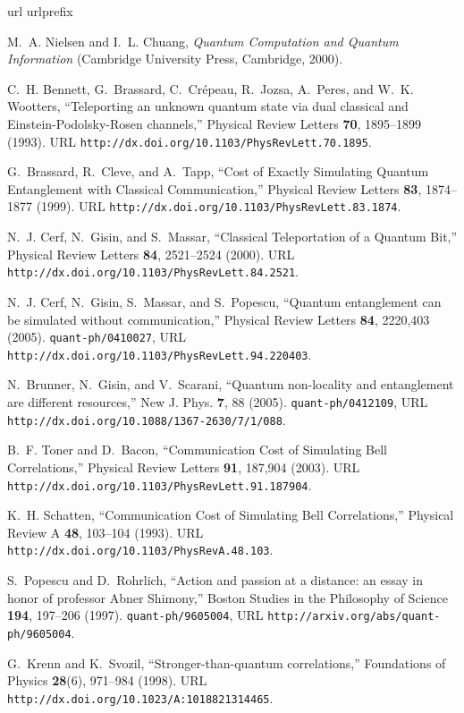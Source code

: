 \documentclass[prl,preprint,amsfonts,showpacs,showkeys]{revtex4}
\begin{document}
\begin{thebibliography}{10}
\newcommand{\enquote}[1]{``#1''}
\expandafter\ifx\csname url\endcsname\relax
  \def\url#1{\texttt{#1}}\fi
\expandafter\ifx\csname urlprefix\endcsname\relax\def\urlprefix{URL }\fi
\providecommand{\eprint}[2][]{\url{#2}}

M.~A. Nielsen and I.~L. Chuang, \emph{Quantum Computation and Quantum
  Information} (Cambridge University Press, Cambridge, 2000).

C.~H. Bennett, G.~Brassard, C.~Cr{\'{e}}peau, R.~Jozsa, A.~Peres, and W.~K.
  Wootters, \enquote{Teleporting an unknown quantum state via dual classical
  and {E}instein-{P}odolsky-{R}osen channels,} Physical Review Letters
  \textbf{70}, 1895--1899 (1993).
  \urlprefix\url{http://dx.doi.org/10.1103/PhysRevLett.70.1895}.

G.~Brassard, R.~Cleve, and A.~Tapp, \enquote{Cost of Exactly Simulating Quantum
  Entanglement with Classical Communication,} Physical Review Letters
  \textbf{83}, 1874--1877 (1999).
  \urlprefix\url{http://dx.doi.org/10.1103/PhysRevLett.83.1874}.

N.~J. Cerf, N.~Gisin, and S.~Massar, \enquote{Classical Teleportation of a
  Quantum Bit,} Physical Review Letters \textbf{84}, 2521--2524 (2000).
  \urlprefix\url{http://dx.doi.org/10.1103/PhysRevLett.84.2521}.

N.~J. Cerf, N.~Gisin, S.~Massar, and S.~Popescu, \enquote{Quantum entanglement
  can be simulated without communication,} Physical Review Letters \textbf{84},
  2220,403 (2005). \eprint{quant-ph/0410027},
  \urlprefix\url{http://dx.doi.org/10.1103/PhysRevLett.94.220403}.

N.~Brunner, N.~Gisin, and V.~Scarani, \enquote{Quantum non-locality and
  entanglement are different resources,} New J. Phys. \textbf{7}, 88 (2005).
  \eprint{quant-ph/0412109},
  \urlprefix\url{http://dx.doi.org/10.1088/1367-2630/7/1/088}.

B.~F. Toner and D.~Bacon, \enquote{Communication Cost of Simulating Bell
  Correlations,} Physical Review Letters \textbf{91}, 187,904 (2003).
  \urlprefix\url{http://dx.doi.org/10.1103/PhysRevLett.91.187904}.

K.~H. Schatten, \enquote{Communication Cost of Simulating Bell Correlations,}
  Physical Review A \textbf{48}, 103--104 (1993).
  \urlprefix\url{http://dx.doi.org/10.1103/PhysRevA.48.103}.

S.~Popescu and D.~Rohrlich, \enquote{Action and passion at a distance: an essay
  in honor of professor {A}bner {S}himony,} Boston Studies in the Philosophy of
  Science \textbf{194}, 197--206 (1997). \eprint{quant-ph/9605004},
  \urlprefix\url{http://arxiv.org/abs/quant-ph/9605004}.

G.~Krenn and K.~Svozil, \enquote{Stronger-than-quantum correlations,}
  Foundations of Physics \textbf{28}(6), 971--984 (1998).
  \urlprefix\url{http://dx.doi.org/10.1023/A:1018821314465}.

\end{thebibliography}
\end{document}

